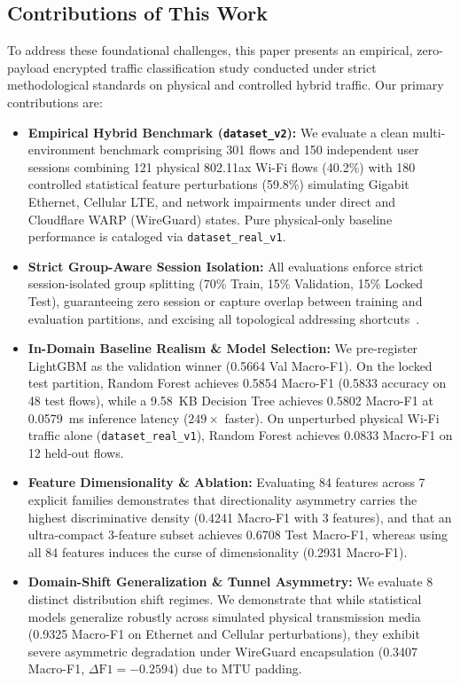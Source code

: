 \documentclass[conference]{IEEEtran}
\begin{document}
\subsection{Contributions of This Work}
To address these foundational challenges, this paper presents an empirical, zero-payload encrypted traffic classification study conducted under strict methodological standards on physical and controlled hybrid traffic. Our primary contributions are:
\begin{itemize}
    \item \textbf{Empirical Hybrid Benchmark (\texttt{dataset\_v2}):} We evaluate a clean multi-environment benchmark comprising 301 flows and 150 independent user sessions combining 121 physical 802.11ax Wi-Fi flows (40.2\%) with 180 controlled statistical feature perturbations (59.8\%) simulating Gigabit Ethernet, Cellular LTE, and network impairments under direct and Cloudflare WARP (WireGuard) states. Pure physical-only baseline performance is cataloged via \texttt{dataset\_real\_v1}.
    \item \textbf{Strict Group-Aware Session Isolation:} All evaluations enforce strict session-isolated group splitting (70\% Train, 15\% Validation, 15\% Locked Test), guaranteeing zero session or capture overlap between training and evaluation partitions, and excising all topological addressing shortcuts~\cite{arp2022dos}.
    \item \textbf{In-Domain Baseline Realism \& Model Selection:} We pre-register LightGBM as the validation winner (0.5664 Val Macro-F1). On the locked test partition, Random Forest achieves 0.5854 Macro-F1 (0.5833 accuracy on 48 test flows), while a 9.58~KB Decision Tree achieves 0.5802 Macro-F1 at 0.0579~ms inference latency ($249\times$ faster). On unperturbed physical Wi-Fi traffic alone (\texttt{dataset\_real\_v1}), Random Forest achieves 0.0833 Macro-F1 on 12 held-out flows.
    \item \textbf{Feature Dimensionality \& Ablation:} Evaluating 84 features across 7 explicit families demonstrates that directionality asymmetry carries the highest discriminative density (0.4241 Macro-F1 with 3 features), and that an ultra-compact 3-feature subset achieves 0.6708 Test Macro-F1, whereas using all 84 features induces the curse of dimensionality (0.2931 Macro-F1).
    \item \textbf{Domain-Shift Generalization \& Tunnel Asymmetry:} We evaluate 8 distinct distribution shift regimes. We demonstrate that while statistical models generalize robustly across simulated physical transmission media (0.9325 Macro-F1 on Ethernet and Cellular perturbations), they exhibit severe asymmetric degradation under WireGuard encapsulation (0.3407 Macro-F1, $\Delta\text{F1} = -0.2594$) due to MTU padding.

\end{itemize}
\end{document}
